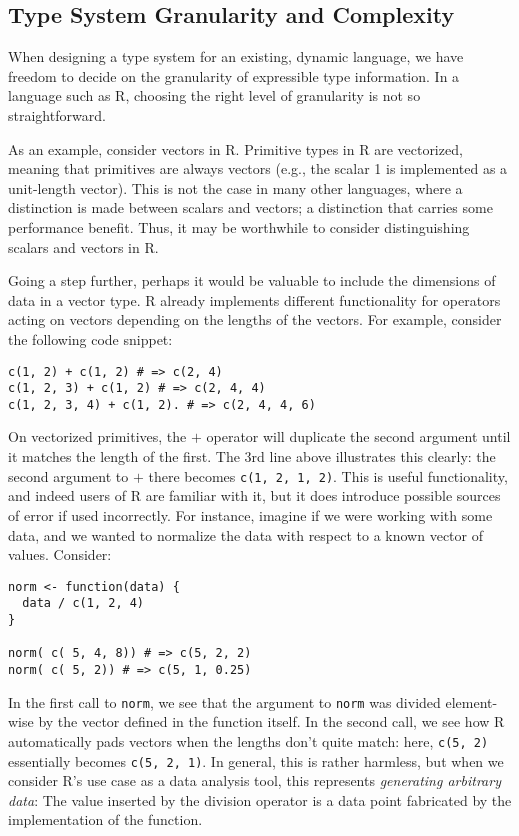 \documentclass[sigplan,10pt,review,anonymous]{acmart}\settopmatter{printfolios=true,printccs=false,printacmref=false}
\begin{document}
%
%
\subsection{Type System Granularity and Complexity}

When designing a type system for an existing, dynamic language, we have freedom to decide on the granularity of expressible type information.
In a language such as R, choosing the right level of granularity is not so straightforward.

As an example, consider vectors in R.
Primitive types in R are vectorized, meaning that primitives are always vectors (e.g., the scalar 1 is implemented as a unit-length vector).
This is not the case in many other languages, where a distinction is made between scalars and vectors; a distinction that carries some performance benefit.
Thus, it may be worthwhile to consider distinguishing scalars and vectors in R.

Going a step further, perhaps it would be valuable to include the dimensions of data in a vector type.
R already implements different functionality for operators acting on vectors depending on the lengths of the vectors.
For example, consider the following code snippet:

\begin{lstlisting}
c(1, 2) + c(1, 2) # => c(2, 4)
c(1, 2, 3) + c(1, 2) # => c(2, 4, 4)
c(1, 2, 3, 4) + c(1, 2). # => c(2, 4, 4, 6)
\end{lstlisting}

On vectorized primitives, the $+$ operator will duplicate the second argument until it matches the length of the first.
The 3rd line above illustrates this clearly: the second argument to $+$ there becomes {\tt c(1, 2, 1, 2)}.
This is useful functionality, and indeed users of R are familiar with it, but it does introduce possible sources of error if used incorrectly.
For instance, imagine if we were working with some data, and we wanted to normalize the data with respect to a known vector of values.
Consider:

\begin{lstlisting}
norm <- function(data) {
  data / c(1, 2, 4)
}

norm( c( 5, 4, 8)) # => c(5, 2, 2)
norm( c( 5, 2)) # => c(5, 1, 0.25)
\end{lstlisting}

In the first call to {\tt norm}, we see that the argument to {\tt norm} was divided element-wise by the vector defined in the function itself.
In the second call, we see how R automatically pads vectors when the lengths don't quite match: here, {\tt c(5, 2)} essentially becomes {\tt c(5, 2, 1)}.
In general, this is rather harmless, but when we consider R's use case as a data analysis tool, this represents {\it generating arbitrary data}: 
The value inserted by the division operator is a data point fabricated by the implementation of the function.
\end{document}
